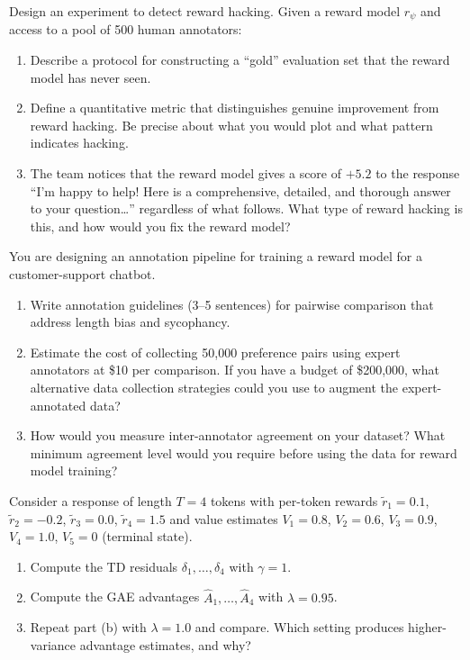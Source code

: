 \begin{exercise}
\label{ex:reward-hacking-detection}
Design an experiment to detect reward hacking. Given a reward model $r_\psi$ and access to a pool of 500 human annotators:
\begin{enumerate}
  \item Describe a protocol for constructing a ``gold'' evaluation set that the reward model has never seen.
  \item Define a quantitative metric that distinguishes genuine improvement from reward hacking. Be precise about what you would plot and what pattern indicates hacking.
  \item The team notices that the reward model gives a score of $+5.2$ to the response ``I'm happy to help! Here is a comprehensive, detailed, and thorough answer to your question\ldots'' regardless of what follows. What type of reward hacking is this, and how would you fix the reward model?
\end{enumerate}
\end{exercise}

\begin{exercise}
\label{ex:annotation-design}
You are designing an annotation pipeline for training a reward model for a customer-support chatbot.
\begin{enumerate}
  \item Write annotation guidelines (3--5 sentences) for pairwise comparison that address length bias and sycophancy.
  \item Estimate the cost of collecting 50{,}000 preference pairs using expert annotators at \$10 per comparison. If you have a budget of \$200{,}000, what alternative data collection strategies could you use to augment the expert-annotated data?
  \item How would you measure inter-annotator agreement on your dataset? What minimum agreement level would you require before using the data for reward model training?
\end{enumerate}
\end{exercise}

\begin{exercise}
\label{ex:gae-computation}
Consider a response of length $T = 4$ tokens with per-token rewards $\tilde{r}_1 = 0.1$, $\tilde{r}_2 = -0.2$, $\tilde{r}_3 = 0.0$, $\tilde{r}_4 = 1.5$ and value estimates $V_1 = 0.8$, $V_2 = 0.6$, $V_3 = 0.9$, $V_4 = 1.0$, $V_5 = 0$ (terminal state).
\begin{enumerate}
  \item Compute the TD residuals $\delta_1, \ldots, \delta_4$ with $\gamma = 1$.
  \item Compute the GAE advantages $\hat{A}_1, \ldots, \hat{A}_4$ with $\lambda = 0.95$.
  \item Repeat part (b) with $\lambda = 1.0$ and compare. Which setting produces higher-variance advantage estimates, and why?
\end{enumerate}
\end{exercise}

